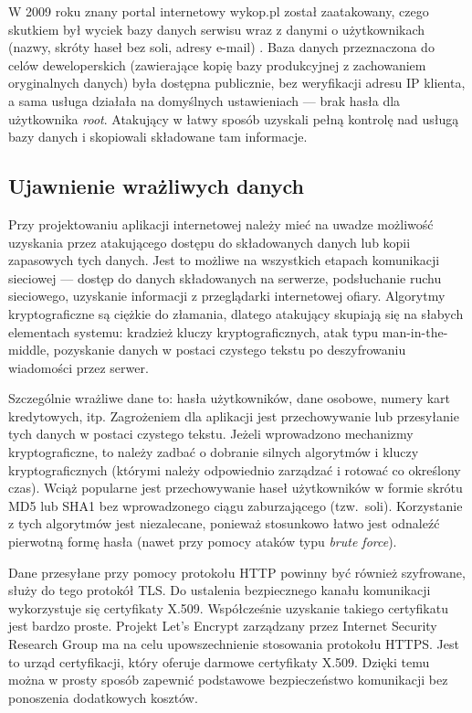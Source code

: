 \documentclass[11pt,a4paper,polish,thesis,oneside]{dcsbook}
\begin{document}
W 2009 roku znany portal internetowy wykop.pl został zaatakowany, czego skutkiem był wyciek bazy danych serwisu wraz z danymi o użytkownikach (nazwy, skróty haseł bez soli, adresy e-mail) \cite{wykop}. Baza danych przeznaczona do celów deweloperskich (zawierające kopię bazy produkcyjnej z zachowaniem oryginalnych danych) była dostępna publicznie, bez weryfikacji adresu IP klienta, a sama usługa działała na domyślnych ustawieniach --- brak hasła dla użytkownika \textit{root}. Atakujący w łatwy sposób uzyskali pełną kontrolę nad usługą bazy danych i skopiowali składowane tam informacje.

\subsection{Ujawnienie wrażliwych danych}
Przy projektowaniu aplikacji internetowej należy mieć na uwadze możliwość uzyskania przez atakującego dostępu do składowanych danych lub kopii zapasowych tych danych. Jest to możliwe na wszystkich etapach komunikacji sieciowej --- dostęp do danych składowanych na serwerze, podsłuchanie ruchu sieciowego, uzyskanie informacji z przeglądarki internetowej ofiary. Algorytmy kryptograficzne są ciężkie do złamania, dlatego atakujący skupiają się na słabych elementach systemu: kradzież kluczy kryptograficznych, atak typu man-in-the-middle, pozyskanie danych w postaci czystego tekstu po deszyfrowaniu wiadomości przez serwer.

Szczególnie wrażliwe dane to: hasła użytkowników, dane osobowe, numery kart kredytowych, itp. Zagrożeniem dla aplikacji jest przechowywanie lub przesyłanie tych danych w postaci czystego tekstu. Jeżeli wprowadzono mechanizmy kryptograficzne, to należy zadbać o dobranie silnych algorytmów i kluczy kryptograficznych (którymi należy odpowiednio zarządzać i rotować co określony czas). Wciąż popularne jest przechowywanie haseł użytkowników w formie skrótu MD5 lub SHA1 bez wprowadzonego ciągu zaburzającego (tzw.~soli). Korzystanie z tych algorytmów jest niezalecane, ponieważ stosunkowo łatwo jest odnaleźć pierwotną formę hasła (nawet przy pomocy ataków typu \textit{brute force}). 

Dane przesyłane przy pomocy protokołu HTTP powinny być również szyfrowane, służy do tego protokół TLS. Do ustalenia bezpiecznego kanału komunikacji wykorzystuje się certyfikaty X.509. Współcześnie uzyskanie takiego certyfikatu jest bardzo proste. Projekt Let's Encrypt zarządzany przez Internet Security Research Group ma na celu upowszechnienie stosowania protokołu HTTPS. Jest to urząd certyfikacji, który oferuje darmowe certyfikaty X.509. Dzięki temu można w prosty sposób zapewnić podstawowe bezpieczeństwo komunikacji bez ponoszenia dodatkowych kosztów.
\end{document}
